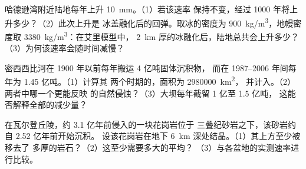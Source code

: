 \begin{exercise}[$\star\star\star$]\label{exo:g12:destruction-of-mountains:13}
哈德逊湾附近陆地每年上升 \qty{10}{mm}。（1）若该速率
保持不变，经过 1000 年将上升多少？（2）此次上升是
冰盖融化后的回弹。取冰的密度为
\qty{900}{kg/m^3}，地幔密度取 \qty{3380}{kg/m^3}：在艾里模型中，
\qty{2}{km} 厚的冰融化后，陆地总共会上升多少？
（3）为何该速率会随时间减慢？
\end{exercise}

\begin{exercise}[$\star\star\star$]\label{exo:g12:destruction-of-mountains:14}
密西西比河在 1900 年以前每年搬运 4 亿吨固体沉积物，
而在 1987--2006 年间每年为 1.45 亿吨。（1）计算其
两个时期的，面积为 \qty{2980000}{km^2}，
并计入。（2）两者中哪一个更能反映
的自然侵蚀？（3）大坝每年截留 1 亿至 1.5 亿吨，
这能否解释全部的减少量？
\end{exercise}

\begin{exercise}[$\star\star\star$]\label{exo:g12:destruction-of-mountains:15}
在瓦尔登丘陵，约 3.1 亿年前侵入的一块花岗岩位于
三叠纪砂岩之下，该砂岩约自 2.52 亿年前开始沉积。
设该花岗岩在地下 \qty{6}{km} 深处结晶。（1）其上方至少被移去了
多厚的岩石？（2）这至少需要多大的平均？
（3）与各盆地的实测速率进行比较。
\end{exercise}

